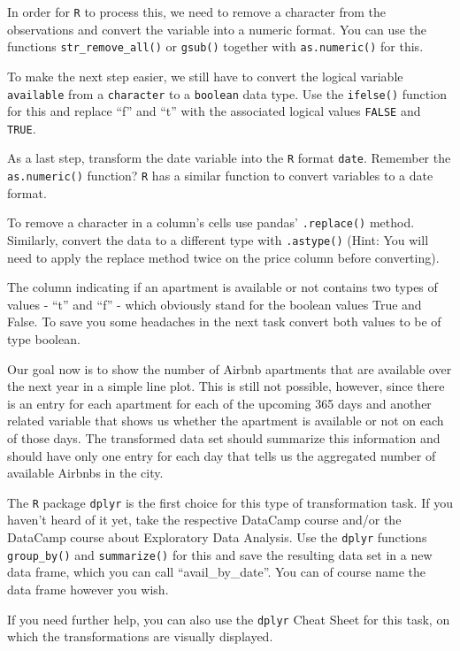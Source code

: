 \documentclass[
  11pt,
]{article}
\newenvironment{tips}[1]
  {
  \begin{itemize}
  \footnotesize
  \renewcommand{\labelitemi}{
    \raisebox{-.7\height}[0pt][0pt]{
      {\setkeys{Gin}{width=3em,keepaspectratio}
        \texttt{[image: images/\#1.png]}}
    }
  }
  \setlength{\fboxsep}{1em}
  \begin{rbox}
  \item
  }
  {
  \end{rbox}
  \end{itemize}
  }
\newenvironment{tipsp}[1]
  {
  \begin{itemize}
  \footnotesize
  \renewcommand{\labelitemi}{
    \raisebox{-.7\height}[0pt][0pt]{
      {\setkeys{Gin}{width=3em,keepaspectratio}
        \texttt{[image: images/\#1.png]}}
    }
  }
  \setlength{\fboxsep}{1em}
  \begin{pbox}
  \item
  }
  {
  \end{pbox}
  \end{itemize}
  }
\begin{document}
\begin{tips}r
In order for \texttt{R} to process this, we need to remove a character from the observations and convert the variable into a numeric format. You can use the functions \texttt{str\_remove\_all()} or \texttt{gsub()} together with \texttt{as.numeric()} for this.

To make the next step easier, we still have to convert the logical variable \texttt{available} from a \texttt{character} to a \texttt{boolean} data type. Use the \texttt{ifelse()} function for this
and replace ``f'' and ``t'' with the associated logical values \texttt{FALSE} and \texttt{TRUE}.

As a last step, transform the date variable into the \texttt{R} format \texttt{date}. Remember the \texttt{as.numeric()} function? \texttt{R} has a similar function to convert variables to a date format.

\end{tips}

\begin{tipsp}p
To remove a character in a column's cells use pandas' \texttt{.replace()} method. Similarly, convert the data to a different type with \texttt{.astype()} (Hint: You will need to apply the replace method twice on the price column before converting).

The column indicating if an apartment is available or not contains two types of values - ``t'' and ``f'' - which obviously stand for the boolean values True and False. To save you some headaches in the next task convert both values to be of type boolean.

\end{tipsp}

Our goal now is to show the number of Airbnb apartments that are available over the next year in a simple line plot. This is still not possible, however, since there is an entry for each apartment for each of the upcoming 365 days and another related variable that shows us whether the apartment is available or not on each of those days. The transformed data set should summarize this information and should have only one entry for each day that tells us the aggregated number of available Airbnbs in the city.

\begin{tips}r
The \texttt{R} package \texttt{dplyr} is the first choice for this type of transformation task. If you haven't heard of it yet, take the respective DataCamp course and/or the DataCamp course about Exploratory Data Analysis. Use the \texttt{dplyr} functions \texttt{group\_by()} and \texttt{summarize()} for this and save the resulting data set in a new data frame, which you can call ``avail\_by\_date''. You can of course name the data frame however you wish.

If you need further help, you can also use the \texttt{dplyr} Cheat Sheet for this task, on which the transformations are visually displayed.

\end{tips}
\end{document}
